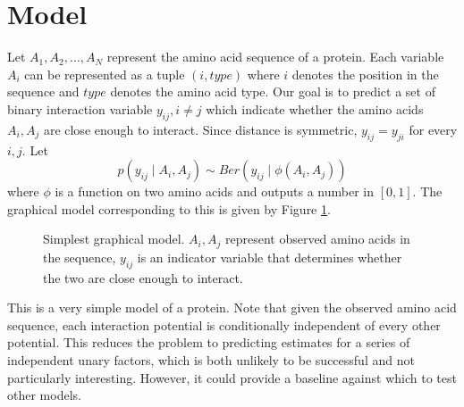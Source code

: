 \documentclass{article}
\begin{document}
\section{Model}
Let $A_1, A_2, \ldots, A_N$ represent the amino acid sequence of a protein. Each variable $A_i$ can be represented as a tuple $(i, type)$ where $i$ denotes the position in the sequence and $type$ denotes the amino acid type. Our goal is to predict a set of binary interaction variable $y_{ij}, i \neq j$ which indicate whether the amino acids $A_i, A_j$ are close enough to interact. Since distance is symmetric, $y_{ij} = y_{ji}$ for every $i, j$. Let 
\[
p(y_{ij} \mid A_i, A_j) \sim Ber(y_{ij} \mid \phi(A_i, A_j))
\]
where $\phi$ is a function on two amino acids and outputs a number in $[0, 1]$. The graphical model corresponding to this is given by Figure \ref{fig:naive_model}.
\begin{figure}[H]
\centering
{}
\caption{Simplest graphical model. $A_i, A_j$ represent observed amino acids in the sequence, $y_{ij}$ is an indicator variable that determines whether the two are close enough to interact.}
\label{fig:naive_model}
\end{figure}
This is a very simple model of a protein. Note that given the observed amino acid sequence, each interaction potential is conditionally independent of every other potential. This reduces the problem to predicting estimates for a series of independent unary factors, which is both unlikely to be successful and not particularly interesting. However, it could provide a baseline against which to test other models.
\end{document}
